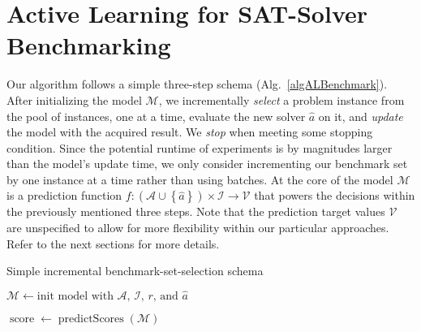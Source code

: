 \documentclass[runningheads]{llncs}
\begin{document}
\section{Active Learning for SAT-Solver Benchmarking}
\label{sec:main}
Our algorithm follows a simple three-step schema (Alg.~\ref{algALBenchmark}). After initializing the model $\mathcal{M}$, we incrementally \textit{select} a problem instance from the pool of instances, one at a time, evaluate the new solver $\hat{a}$ on it, and \textit{update} the model with the acquired result. We \textit{stop} when meeting some stopping condition.
Since the potential runtime of experiments is by magnitudes larger than the model's update time, we only consider incrementing our benchmark set by one instance at a time rather than using batches.
At the core of the model $\mathcal{M}$ is a prediction function $f\!: \left(\mathcal{A} \cup \left\lbrace \hat{a} \right\rbrace\right) \times \mathcal{I} \rightarrow \mathcal{V}$ that powers the decisions within the previously mentioned three steps.
Note that the prediction target values $\mathcal{V}$ are unspecified to allow for more flexibility within our particular approaches.
Refer to the next sections for more details.

\begin{algorithm}
  \caption{Simple incremental benchmark-set-selection schema}
  \label{algALBenchmark}


  $\mathcal{M} \leftarrow \textrm{init model with $\mathcal{A}$, $\mathcal{I}$, $r$, and $\hat{a}$}$


  $\operatorname{score} \leftarrow \operatorname{predictScores}\!\left(\mathcal{M}\right)$

\end{algorithm}
\end{document}
